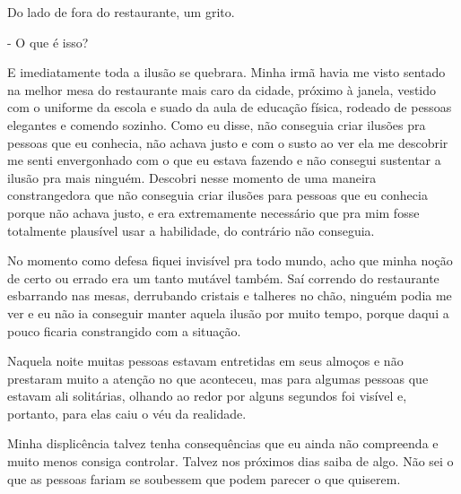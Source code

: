 Do lado de fora do restaurante, um grito.

- O que é isso?

E imediatamente toda a ilusão se quebrara. Minha irmã havia me visto sentado na melhor mesa do restaurante mais caro da cidade, próximo à janela, vestido com o uniforme da escola e suado da aula de educação física, rodeado de pessoas elegantes e comendo sozinho. Como eu disse, não conseguia criar ilusões pra pessoas que eu conhecia, não achava justo e com o susto ao ver ela me descobrir me senti envergonhado com o que eu estava fazendo e não consegui sustentar a ilusão pra mais ninguém. Descobri nesse momento de uma maneira constrangedora que não conseguia criar ilusões para pessoas que eu conhecia porque não achava justo, e era extremamente necessário que pra mim fosse totalmente plausível usar a habilidade, do contrário não conseguia.

No momento como defesa fiquei invisível pra todo mundo, acho que minha noção de certo ou errado era um tanto mutável também. Saí correndo do restaurante esbarrando nas mesas, derrubando cristais e talheres no chão, ninguém podia me ver e eu não ia conseguir manter aquela ilusão por muito tempo, porque daqui a pouco ficaria constrangido com a situação.

Naquela noite muitas pessoas estavam entretidas em seus almoços e não prestaram muito a atenção no que aconteceu, mas para algumas pessoas que estavam ali solitárias, olhando ao redor por alguns segundos foi visível e, portanto, para elas caiu o véu da realidade.

Minha displicência talvez tenha consequências que eu ainda não compreenda e muito menos consiga controlar. Talvez nos próximos dias saiba de algo. Não sei o que as pessoas fariam se soubessem que podem parecer o que quiserem.



